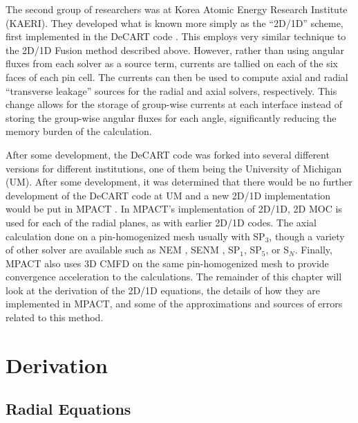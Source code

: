 The second group of researchers was at Korea Atomic Energy Research Institute (KAERI).  They developed what is known more simply as the ``2D/1D'' scheme, first implemented in the DeCART code \cite{3DHetWholeCoreTransPlanarMOC,DeCARTTheoryManual,MethodsAndPerformanceOfDecart}.  This employs very similar technique to the 2D/1D Fusion method described above.  However, rather than using angular fluxes from each solver as a source term, currents are tallied on each of the six faces of each pin cell.  The currents can then be used to compute axial and radial ``transverse leakage'' sources for the radial and axial solvers, respectively.  This change allows for the storage of group-wise currents at each interface instead of storing the group-wise angular fluxes for each angle, significantly reducing the memory burden of the calculation.

After some development, the DeCART code was forked into several different versions for different institutions, one of them being the University of Michigan (UM).  After some development, it was determined that there would be no further development of the DeCART code at UM and a new 2D/1D implementation would be put in MPACT \cite{2D1DApproxTo3DTransport1,StabilityAndAccuracyOf3DTransportInMPACT}.  In MPACT's implementation of 2D/1D, 2D MOC is used for each of the radial planes, as with earlier 2D/1D codes.  The axial calculation done on a pin-homogenized mesh usually with SP$_3$, though a variety of other solver are available such as NEM , SENM , SP$_1$, SP$_5$, or S$_N$.  Finally, MPACT also uses 3D CMFD on the same pin-homogenized mesh to provide convergence acceleration to the calculations.  The remainder of this chapter will look at the derivation of the 2D/1D equations, the details of how they are implemented in MPACT, and some of the approximations and sources of errors related to this method.

\section{Derivation}

\subsection{Radial Equations}

